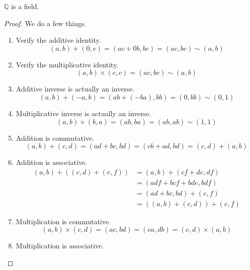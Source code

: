   \begin{theorem}
    $\mathbb{Q}$ is a field. 
  \end{theorem} 
  \begin{proof}
    We do a few things. 
    \begin{enumerate}
      \item Verify the additive identity. 
      \begin{equation}
        (a, b) + (0, c) = (ac + 0b, bc) = (ac, bc) \sim (a, b)
      \end{equation}
      \item Verify the multiplicative identity. 
      \begin{equation}
        (a, b) \times (c, c) = (ac, bc) \sim (a, b)
      \end{equation}
      \item Additive inverse is actually an inverse. 
      \begin{equation}
        (a, b) + (-a, b) = (ab + (-ba), bb) = (0, bb) \sim (0, 1)
      \end{equation}
      \item Multiplicative inverse is actually an inverse. 
      \begin{equation}
        (a, b) \times (b, a) = (ab, ba) = (ab, ab) \sim (1, 1)
      \end{equation}
      \item Addition is commutative. 
      \begin{equation}
        (a, b) + (c, d) = (ad + bc, bd) = (cb + ad, bd) = (c, d) + (a, b)
      \end{equation}
      \item Addition is associative. 
      \begin{align}
        (a, b) + ((c, d) + (e, f)) & = (a, b) + (cf + de, df) \\
                                   & = (adf + bcf + bde, bdf) \\
                                   & = (ad + bc, bd) + (e, f) \\
                                   & = ((a, b) + (c, d)) + (e, f)
      \end{align}
      \item Multiplication is commutative. 
      \begin{equation}
        (a, b) \times (c, d) = (ac, bd) = (ca, db) = (c, d) \times (a, b)
      \end{equation}
      \item Multiplication is associative. 

\end{enumerate}
\end{proof}
